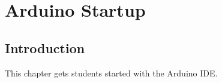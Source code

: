 \chapter{Arduino Startup}

\section{Introduction}
This chapter gets students started with the Arduino IDE.
